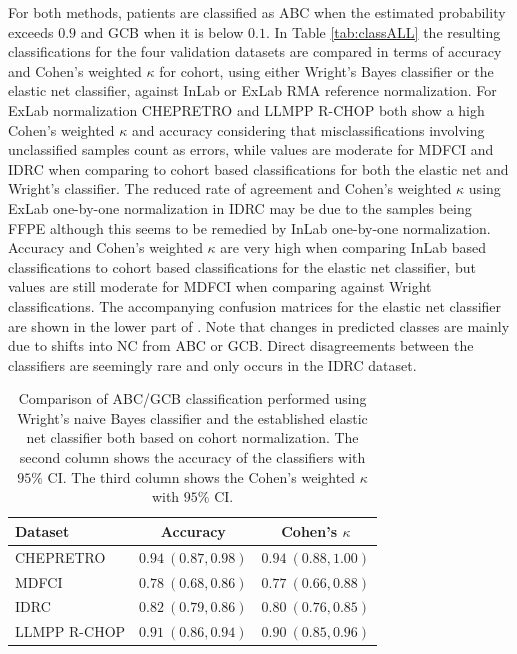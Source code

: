 \documentclass[10pt,letterpaper]{article}
\begin{document}
For both methods, patients are classified as ABC when the estimated probability exceeds $0.9$ and GCB when it is below $0.1$.
In Table \mbox{\ref{tab:classALL}} the resulting classifications for the four validation datasets are compared in terms of accuracy and Cohen's weighted $\kappa$ for cohort, using either Wright's Bayes classifier or the elastic net classifier, against InLab or ExLab RMA reference normalization.
For ExLab normalization CHEPRETRO and LLMPP R-CHOP both show a high Cohen's weighted $\kappa$ and accuracy considering that misclassifications involving unclassified samples count as errors, while values are moderate for MDFCI and IDRC when comparing to cohort based classifications for both the elastic net and Wright's classifier. 
The reduced rate of agreement and Cohen's weighted $\kappa$ using ExLab one-by-one normalization in IDRC may be due to the samples being FFPE although this seems to be remedied by InLab one-by-one normalization. Accuracy and Cohen's weighted $\kappa$ are very high when comparing InLab based classifications to cohort based classifications for the elastic net classifier, but values are still moderate for MDFCI when comparing against Wright classifications.
The accompanying confusion matrices for the elastic net classifier are shown in the lower part of .
Note that changes in predicted classes are mainly due to shifts into NC from ABC or GCB.
Direct disagreements between the classifiers are seemingly rare and only occurs in the IDRC dataset.

%
\begin{table}[!tbp]
	{\small
		\caption{Comparison of ABC/GCB classification performed using Wright's naive
			Bayes classifier \cite{Wright2003} and the established elastic net classifier
			both based on cohort normalization.
			The second column shows the accuracy of the
			classifiers with $95\%$ CI. The third column shows the Cohen's weighted
			$\kappa$ with $95\%$ CI.\label{tab:ABCGCBclassifier}} 
		\begin{center}
			\begin{tabular}{lll}
				\hline\hline
				\multicolumn{1}{l}{Dataset}&\multicolumn{1}{c}{Accuracy}&\multicolumn{1}{c}{Cohen's $\kappa$}\tabularnewline
				\hline
				CHEPRETRO&$0.94~(0.87, 0.98)$&$0.94~(0.88, 1.00)$\tabularnewline
				MDFCI&$0.78~(0.68, 0.86)$&$0.77~(0.66, 0.88)$\tabularnewline
				IDRC&$0.82~(0.79, 0.86)$&$0.80~(0.76, 0.85)$\tabularnewline
				LLMPP R-CHOP&$0.91~(0.86, 0.94)$&$0.90~(0.85, 0.96)$\tabularnewline
				\hline
			\end{tabular}
		\end{center}}
\end{table}
\end{document}
